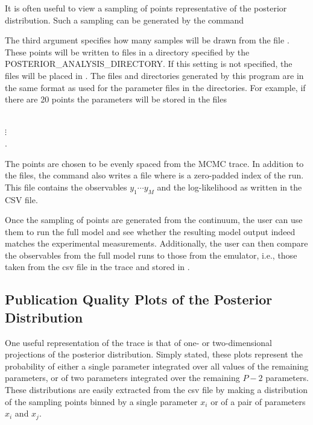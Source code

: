  It is often useful to view a sampling of points
 representative of the posterior distribution. Such a
 sampling can be generated by the command


The third argument specifies how many samples will be drawn from the file . These points will be written to files in a directory specified by the POSTERIOR\_ANALYSIS\_DIRECTORY. If this setting is not specified, the files will be placed in . The files and directories generated by this program are in the same format as used for the
 parameter files in the  directories. For
 example, if there are 20 points the parameters will be
 stored in the files

\\
$\vdots$\\
.

 The points are chosen to be evenly spaced from the MCMC
 trace. In addition to the  files, the
 command also writes a file
  where  is a zero-padded index of the run. This
 file contains the observables $y_1\cdots y_M$ and the
 log-likelihood as written in the CSV file.

 Once the sampling of points are generated from the
 continuum, the user can use them to run the full model and
 see whether the resulting model output indeed matches the
 experimental measurements. Additionally, the user can then
 compare the observables from the full model runs to those
 from the emulator, i.e., those taken from the csv file in
 the trace and stored in
 .

\subsection{Publication Quality Plots of the Posterior Distribution}\label{subsec:PublicationQualityPlots}

One useful representation of the trace is that of one- or two-dimensional projections of the posterior distribution. Simply stated, these plots represent the probability of either a single parameter integrated over all values of the remaining parameters, or of two parameters integrated over the remaining $P-2$ parameters. These distributions are easily extracted from the csv file by making a distribution of the sampling points binned by a single parameter $x_i$ or of a pair of parameters $x_i$ and $x_j$.


